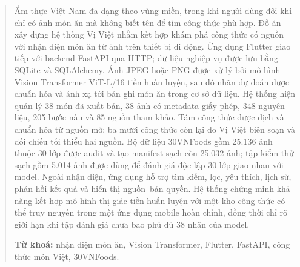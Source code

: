 \begin{abstract}

Ẩm thực Việt Nam đa dạng theo vùng miền, trong khi người dùng đôi khi chỉ có
ảnh món ăn mà không biết tên để tìm công thức phù hợp. Đồ án xây dựng hệ
thống Vị Việt nhằm kết hợp khám phá công thức có nguồn với nhận diện món ăn
từ ảnh trên thiết bị di động. Ứng dụng Flutter giao tiếp với backend FastAPI
qua HTTP; dữ liệu nghiệp vụ được lưu bằng SQLite và SQLAlchemy. Ảnh JPEG hoặc
PNG được xử lý bởi mô hình Vision Transformer ViT-L/16 tiền huấn luyện, sau
đó nhãn dự đoán được chuẩn hóa và ánh xạ tới bản ghi món ăn trong cơ sở dữ
liệu. Hệ thống hiện quản lý 38 món đã xuất bản, 38 ảnh có metadata giấy phép,
348 nguyên liệu, 205 bước nấu và 85 nguồn tham khảo. Tám công thức được dịch
và chuẩn hóa từ nguồn mở; ba mươi công thức còn lại do Vị Việt biên soạn và
đối chiếu tối thiểu hai nguồn. Bộ dữ liệu 30VNFoods gồm 25.136 ảnh thuộc 30
lớp được audit và tạo manifest sạch còn 25.032 ảnh; tập kiểm thử sạch gồm
5.014 ảnh được dùng để đánh giá độc lập 30 lớp giao nhau với model. Ngoài
nhận diện, ứng dụng hỗ trợ tìm kiếm, lọc, yêu thích, lịch sử, phản hồi kết
quả và hiển thị nguồn--bản quyền. Hệ thống chứng minh khả năng kết hợp mô
hình thị giác tiền huấn luyện với một kho công thức có thể truy nguyên trong
một ứng dụng mobile hoàn chỉnh, đồng thời chỉ rõ giới hạn khi tập đánh giá
chưa bao phủ đủ 38 nhãn của model.

\vspace{0.8em}
\noindent\textbf{Từ khoá:} nhận diện món ăn, Vision Transformer, Flutter,
FastAPI, công thức món Việt, 30VNFoods.

\end{abstract}
